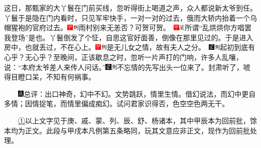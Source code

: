 这日，那甄家的大丫鬟在门前买线，忽听得街上喝道之声，众人都说新太爷到任。丫鬟于是隐在门内看时，只见军牢快手，一对一对的过去，俄而大轿内抬着一个乌帽猩袍的官府过去。{\includegraphics[width=3mm]{../Images/00002}\includegraphics[width=3mm]{../Images/00011}\footnotesize 雨村别来无恙否？可贺可贺。　\includegraphics[width=3mm]{../Images/00002}\includegraphics[width=3mm]{../Images/00010}\footnotesize  所谓``乱烘烘你方唱罢我登场''是也。}丫鬟倒发了个怔，自思这官好面善，倒像在那里见过的。于是进入房中，也就丢过，不在心上。{{\includegraphics[width=3mm]{../Images/00002}\includegraphics[width=3mm]{../Images/00011}\footnotesize 是无儿女之情，故有夫人之分。　}\includegraphics[width=3mm]{../Images/00006}\includegraphics[width=3mm]{../Images/00011}\footnotesize 起初到底有心乎？无心乎？}至晚间，正该歇息之时，忽听一片声打的门响，许多人乱嚷，说：``本府太爷差人来传人问话。''{\includegraphics[width=3mm]{../Images/00006}\includegraphics[width=3mm]{../Images/00011}\footnotesize 不忘情的先写出头一位来了。}封肃听了，唬得目瞪口呆，不知有何祸事。

　　{\includegraphics[width=3mm]{../Images/00005}总评：出口神奇，幻中不幻。文势跳跃，情里生情。借幻说法，而幻中更自多情；因情捉笔，而情里偏成痴幻。试问君家识得否，色空空色两无干。}

　　{\href{../Text/part0005_split_000.html\#navto_1_a}{①}以上文字见于庚、戚、蒙、列、辰、舒、杨诸本，其中甲辰本为回前批，馀本均为正文。此段与甲戌本凡例第五条略同，玩其文意应非正文，现作为回前批处理。}

